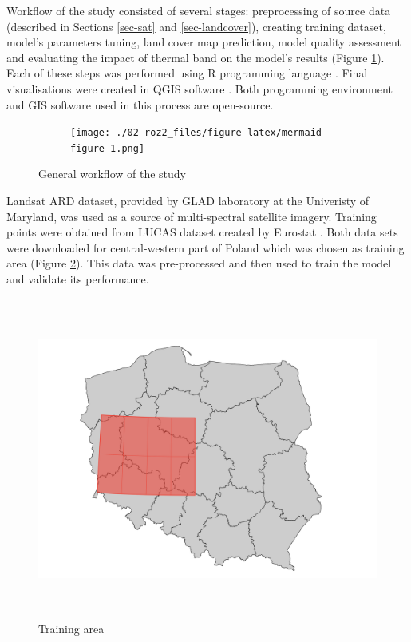 \documentclass{amuthesis}
\begin{document}
Workflow of the study consisted of several stages: preprocessing of
source data (described in Sections \ref{sec-sat} and
\ref{sec-landcover}), creating training dataset, model's parameters
tuning, land cover map prediction, model quality assessment and
evaluating the impact of thermal band on the model's results (Figure
\ref{fig-rycina4}). Each of these steps was performed using R
programming language \autocite{R-base}. Final visualisations were
created in QGIS software \autocite{qgis_development_team_qgis_2009}.
Both programming environment and GIS software used in this process are
open-source.

\begin{figure}

{\centering 

\begin{figure}[H]

{\centering \texttt{[image: ./02-roz2\_files/figure-latex/mermaid-figure-1.png]}

}

\end{figure}

}

\caption{\label{fig-rycina4}General workflow of the study}

\end{figure}

Landsat ARD dataset, provided by GLAD laboratory at the Univeristy of
Maryland, was used as a source of multi-spectral satellite imagery.
Training points were obtained from LUCAS dataset created by Eurostat
\autocite{dandrimont_harmonised_2020}. Both data sets were downloaded
for central-western part of Poland which was chosen as training area
(Figure \ref{fig-rycina1}). This data was pre-processed and then used to
train the model and validate its performance.

\begin{figure}[t]

{\centering \includegraphics[width=1\textwidth,height=4.16667in]{./figures/study_area.png}

}

\caption{\label{fig-rycina1}Training area}

\end{figure}
\end{document}
